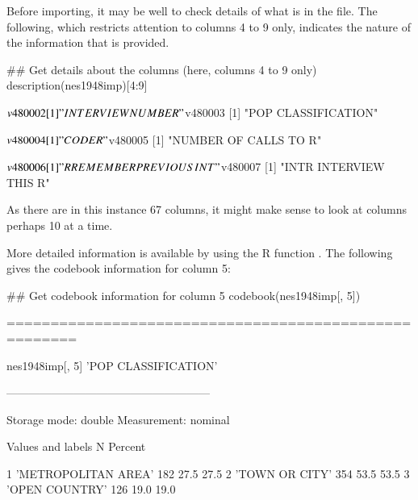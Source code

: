   Before importing, it may be well to check details of
what is in the file. The following, which restricts attention to
columns 4 to 9 only, indicates the nature of the information that is
provided.
\begin{fullwidth}
\begin{Schunk}
\begin{Sinput}
## Get details about the columns (here, columns 4 to 9 only)
description(nes1948imp)[4:9]
\end{Sinput}
\end{Schunk}

\begin{Schunk}
\begin{Soutput}
$v480002
[1] "INTERVIEW NUMBER"

$v480003
[1] "POP CLASSIFICATION"

$v480004
[1] "CODER"

$v480005
[1] "NUMBER OF CALLS TO R"

$v480006
[1] "R REMEMBER PREVIOUS INT"

$v480007
[1] "INTR INTERVIEW THIS R"
\end{Soutput}
\end{Schunk}
\end{fullwidth}
\noindent
As there are in this instance 67 columns, it might make sense to look
at columns perhaps 10 at a time.

More detailed information is available by using the R function
.
The following gives the codebook information for  column 5:
\begin{Schunk}
\begin{Sinput}
## Get codebook information for column 5
codebook(nes1948imp[, 5])
\end{Sinput}
\begin{Soutput}
======================================================

   nes1948imp[, 5] 'POP CLASSIFICATION'

------------------------------------------------------

   Storage mode: double
   Measurement: nominal

         Values and labels    N    Percent 
                                           
   1   'METROPOLITAN AREA'  182   27.5 27.5
   2   'TOWN OR CITY'       354   53.5 53.5
   3   'OPEN COUNTRY'       126   19.0 19.0
\end{Soutput}
\end{Schunk}

